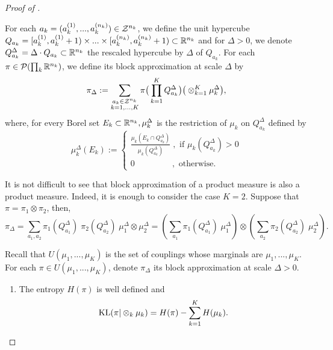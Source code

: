 \begin{proof}[Proof of ]
\begin{definition}
      For each $a_k = (a_k^{(1)}, ...,a_k^{(n_k)}) \in \mathcal Z^{n_k}$, we define the unit hypercube
      $Q_{a_k} = [a_k^{(1)}, a_k^{(1)} + 1) \times ... \times [a_k^{(n_k)}, a_k^{(n_k)} + 1) \subset \mathbb R^{n_k}$ and for $\Delta > 0$,
      we denote $Q^{\Delta}_{a_k} = \Delta \cdot Q_{a_k} \subset \mathbb R^{n_k}$ the rescaled hypercube by $\Delta$ of $Q_{a_k}$.
      For each $\pi \in \mathcal P(\prod_k \mathbb R^{n_k})$, we define its block approximation at scale $\Delta$ by
      \begin{equation}
        \pi_{\Delta} := \sum_{\substack{a_k \in \mathcal Z^{n_k} \\ k = 1, ..., K}}
        \pi \big(\prod_{k=1}^K Q^{\Delta}_{a_k}\big) \big( \otimes_{k=1}^K \mu_k^{\Delta} \big),
      \end{equation}
      where, for every Borel set $E_k \subset \mathbb R^{n_k}, \mu_k^{\Delta}$ is the restriction of $\mu_k$ on $Q^{\Delta}_{a_k}$ defined by
      \begin{equation}
        \mu_k^{\Delta}(E_k):=
        \begin{cases}
          \frac{\mu_k(E_k \cap Q^{\Delta}_{a_k})}{\mu_k(Q^{\Delta}_{a_k})} \; ,\text{ if } \mu_k(Q^{\Delta}_{a_k}) > 0 \\
          0 \;\;\;\;\;\;\;\;\;\;\;\;\;\;\;\;,\text{ otherwise}.
        \end{cases}
      \end{equation}
    \end{definition}
    It is not difficult to see that block approximation of a product measure is also a product measure. Indeed, it is enough to consider the case
    $K=2$. Suppose that $\pi = \pi_1 \otimes \pi_2$, then,
    \begin{equation}
      \pi_{\Delta} = \sum_{a_1, a_2}
      \pi_1(Q^{\Delta}_{a_1}) \; \pi_2(Q^{\Delta}_{a_2}) \; \mu_1^{\Delta} \otimes \mu_2^{\Delta} =
      \left( \sum_{a_1} \pi_1(Q^{\Delta}_{a_1}) \; \mu_1^{\Delta} \right) \otimes
      \left( \sum_{a_2} \pi_2(Q^{\Delta}_{a_2}) \; \mu_2^{\Delta} \right).
    \end{equation}
    \begin{lemma}
        \label{lemma:block_approx}
      Recall that $U(\mu_1, ..., \mu_K)$ is the set of couplings whose marginals are $\mu_1,...,\mu_K$.
      For each $\pi \in U(\mu_1, ..., \mu_K)$, denote $\pi_{\Delta}$ its block approximation at scale $\Delta > 0$.
      \begin{enumerate}
        \item The entropy $H(\pi)$ is well defined and
        \begin{equation}
          \text{KL}(\pi \vert \otimes_k \mu_k) = H(\pi) - \sum_{k=1}^K H(\mu_k).
        \end{equation}


\end{enumerate}
\end{lemma}
\end{proof}
